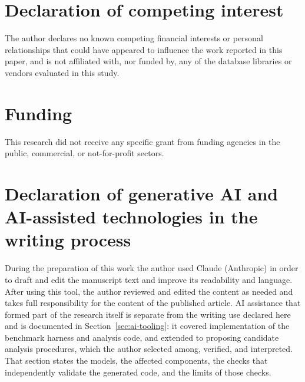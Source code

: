 \documentclass[12pt,a4paper]{article}
\begin{document}
\section*{Declaration of competing interest}
The author declares no known competing financial interests or personal
relationships that could have appeared to influence the work reported in this paper,
and is not affiliated with, nor funded by, any of the database libraries or vendors
evaluated in this study.

\section*{Funding}
This research did not receive any specific grant from funding agencies in the
public, commercial, or not-for-profit sectors.

\section*{Declaration of generative AI and AI-assisted technologies in the writing process}
During the preparation of this work the author used Claude (Anthropic) in order to draft and edit the
manuscript text and improve its readability and language. After using this tool, the author reviewed
and edited the content as needed and takes full responsibility for the content of the published
article. AI assistance that formed part of the research itself is separate from the writing
use declared here and is documented in Section~\ref{sec:ai-tooling}: it covered implementation of the
benchmark harness and analysis code, and extended to proposing candidate analysis procedures, which
the author selected among, verified, and interpreted. That section states the models, the affected
components, the checks that independently validate the generated code, and the limits of those checks.

\printbibliography
\end{document}
